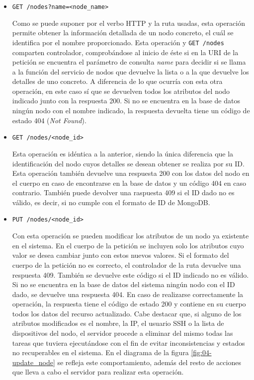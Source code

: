 \begin{itemize}
    \item \texttt{GET /nodes?name=<node\_name>}

          Como se puede suponer por el verbo HTTP y la ruta usadas, esta
          operación permite obtener la información detallada de un nodo
          concreto, el cuál se identifica por el nombre proporcionado. Esta
          operación y \texttt{GET /nodes} comparten controlador, comprobándose
          al inicio de éste si en la URI de la petición se encuentra el
          parámetro de consulta \textit{name} para decidir si se llama a la
          función del servicio de nodos que devuelve la lista o a la que
          devuelve los detalles de uno concreto. A diferencia de lo que ocurría
          con esta otra operación, en este caso sí que se devuelven todos los
          atributos del nodo indicado junto con la respuesta 200. Si no se
          encuentra en la base de datos ningún nodo con el nombre indicado, la
          respuesta devuelta tiene un código de estado 404 (\textit{Not Found}).

    \item \texttt{GET /nodes/<node\_id>}

          Esta operación es idéntica a la anterior, siendo la única diferencia
          que la identificación del nodo cuyos detalles se desean obtener se
          realiza por su ID. Esta operación también devuelve una respuesta 200
          con los datos del nodo en el cuerpo en caso de encontrarse en la base
          de datos y un código 404 en caso contrario. También puede devolver una
          raspuesta 409 si el ID dado no es válido, es decir, si no cumple con
          el formato de ID de MongoDB.

    \item \texttt{PUT /nodes/<node\_id>}

          Con esta operación se pueden modificar los atributos de un nodo ya
          existente en el sistema. En el cuerpo de la petición se incluyen solo
          los atributos cuyo valor se desea cambiar junto con estos nuevos
          valores. Si el formato del cuerpo de la petición no es correcto, el
          controlador de la ruta devuelve una respuesta 409. También se devuelve
          este código si el ID indicado no es válido. Si no se encuentra en la
          base de datos del sistema ningún nodo con el ID dado, se devuelve una
          respuesta 404. En caso de realizarse correctamente la operación, la
          respuesta tiene el código de estado 200 y contiene en su cuerpo todos
          los datos del recurso actualizado. Cabe destacar que, si alguno de los
          atributos modificados es el nombre, la IP, el usuario SSH o la lista
          de dispositivos del nodo, el servidor procede a eliminar del mismo
          todas las tareas que tuviera ejecutándose con el fin de evitar
          inconsistencias y estados no recuperables en el sistema. En el
          diagrama de la figura \ref{fig:04-update_node} se refleja este
          comportamiento, además del resto de acciones que lleva a cabo el
          servidor para realizar esta operación.


\end{itemize}
